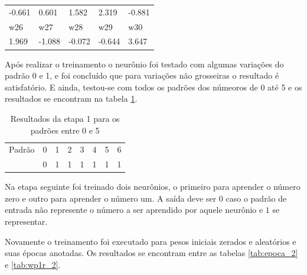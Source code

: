 \documentclass[11pt]{article}
\begin{document}
\begin{table}[h]
\begin{tabular}[width=8cm]{lllll}
  -0.661                                            & 0.601                      & 1.582                      & 2.319                      & -0.881                     \\
  \rowcolor[HTML]{000000}
  {\color[HTML]{FFFFFF} w26}                        & {\color[HTML]{FFFFFF} w27} & {\color[HTML]{FFFFFF} w28} & {\color[HTML]{FFFFFF} w29} & {\color[HTML]{FFFFFF} w30} \\
  1.969                                             & -1.088                     & -0.072                     & -0.644                     & 3.647
  \end{tabular}
\end{table}

Após realizar o treinamento o neurônio foi testado com algumas variações do
padrão 0 e 1, e foi concluído que para variações não grosseiras o resultado é
satisfatório. E ainda, testou-se com todos os padrões dos númeoros de 0 até 5 e
os resultados se encontram na tabela \ref{tab:res01_1}.

\begin{table}[h]
  \centering
  \caption{Resultados da etapa 1 para os padrões entre 0 e 5}
  \label{tab:res01_1}
  \begin{tabular}{llllllll}
  \rowcolor[HTML]{000000}
  {\color[HTML]{FFFFFF} Padrão}                            & {\color[HTML]{FFFFFF} 0} & {\color[HTML]{FFFFFF} 1} & {\color[HTML]{FFFFFF} 2} & {\color[HTML]{FFFFFF} 3} & {\color[HTML]{FFFFFF} 4} & {\color[HTML]{FFFFFF} 5} & {\color[HTML]{FFFFFF} 6} \\
  \cellcolor[HTML]{000000}{\color[HTML]{FFFFFF} Resultado} & 0                        & 1                        & 1                        & 1                        & 1                        & 1                        & 1
  \end{tabular}
\end{table}

Na etapa seguinte foi treinado dois neurônios, o primeiro para aprender o número zero e
outro para aprender o número um. A saída deve ser $0$ caso o padrão de entrada
não represente o número a ser aprendido por aquele neurônio e $1$ se representar.

Novamente o treinamento foi executado para pesos iniciais zerados e aleatórios e
suas épocas anotadas. Os resultados se encontram entre as tabelas \ref{tab:epoca_2}
e \ref{tab:wp1r_2}.
\end{document}
